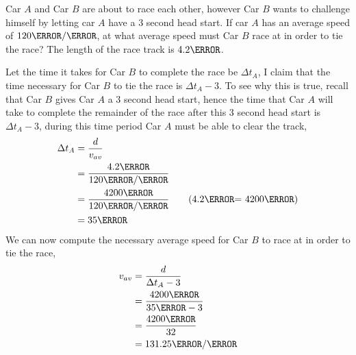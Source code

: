 \documentclass[12pt]{article} %
\begin{document}
\begin{qstn}[7]
    Car $A$ and Car $B$ are about to race each other, however Car $B$ wants to challenge himself by letting car $A$ have a $3$ second head start. If car $A$ has an average speed of $120 \m / \s$, at what average speed must Car $B$ race at in order to tie the race? The length of the race track is $4.2 \km$.



    \begin{soln}
        Let the time it takes for Car $B$ to complete the race be $\Delta t_A$, I claim that the time necessary for Car $B$ to tie the race is $\Delta t_A - 3$. To see why this is true, recall that Car $B$ gives Car $A$ a $3$ second head start, hence the time that Car $A$ will take to complete the remainder of the race after this $3$ second head start is $\Delta t_A - 3$, during this time period Car $A$ must be able to clear the track,
        \begin{align*}
            \Delta t_A &= \frac{d}{v_{av}}\\
            &= \frac{4.2 \km }{120 \m / \s}\\
            &= \frac{4200\m}{120 \m / \s} \tag{4.2\km = 4200\m}\\
            &= 35 \s
        \end{align*}
        We can now compute the necessary average speed for Car $B$ to race at in order to tie the race,
        \begin{align*}
            v_{av} &= \frac{d}{\Delta t_A - 3}\\
            &= \frac{4200\m}{35 \s - 3}\\
            &= \frac{4200 \m}{32}\\
            &= 131.25 \m / \s\\
        \end{align*}

    \end{soln}


\end{qstn}
\end{document}
